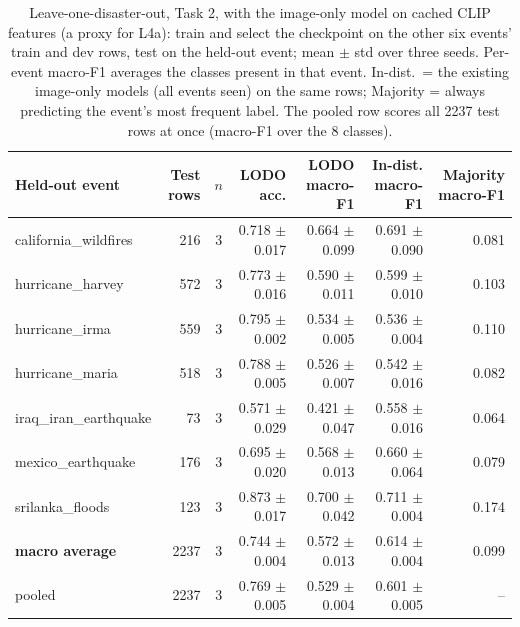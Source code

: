 \begin{table}[t]
\centering
\footnotesize
\caption{Leave-one-disaster-out, Task 2, with the image-only model on cached CLIP features (a proxy for L4a): train and select the checkpoint on the other six events' train and dev rows, test on the held-out event; mean $\pm$ std over three seeds. Per-event macro-F1 averages the classes present in that event. In-dist.\ = the existing image-only models (all events seen) on the same rows; Majority = always predicting the event's most frequent label. The pooled row scores all 2237 test rows at once (macro-F1 over the 8 classes).}
\label{tab:d_t2}
\begin{tabular}{lrcrrrr}
\toprule
Held-out event & Test rows & $n$ & LODO acc. & LODO macro-F1 & In-dist. macro-F1 & Majority macro-F1 \\
\midrule
california\_wildfires & 216 & 3 & 0.718 $\pm$ 0.017 & 0.664 $\pm$ 0.099 & 0.691 $\pm$ 0.090 & 0.081 \\
hurricane\_harvey & 572 & 3 & 0.773 $\pm$ 0.016 & 0.590 $\pm$ 0.011 & 0.599 $\pm$ 0.010 & 0.103 \\
hurricane\_irma & 559 & 3 & 0.795 $\pm$ 0.002 & 0.534 $\pm$ 0.005 & 0.536 $\pm$ 0.004 & 0.110 \\
hurricane\_maria & 518 & 3 & 0.788 $\pm$ 0.005 & 0.526 $\pm$ 0.007 & 0.542 $\pm$ 0.016 & 0.082 \\
iraq\_iran\_earthquake & 73 & 3 & 0.571 $\pm$ 0.029 & 0.421 $\pm$ 0.047 & 0.558 $\pm$ 0.016 & 0.064 \\
mexico\_earthquake & 176 & 3 & 0.695 $\pm$ 0.020 & 0.568 $\pm$ 0.013 & 0.660 $\pm$ 0.064 & 0.079 \\
srilanka\_floods & 123 & 3 & 0.873 $\pm$ 0.017 & 0.700 $\pm$ 0.042 & 0.711 $\pm$ 0.004 & 0.174 \\
\textbf{macro average} & 2237 & 3 & 0.744 $\pm$ 0.004 & 0.572 $\pm$ 0.013 & 0.614 $\pm$ 0.004 & 0.099 \\
pooled & 2237 & 3 & 0.769 $\pm$ 0.005 & 0.529 $\pm$ 0.004 & 0.601 $\pm$ 0.005 & -- \\
\bottomrule
\end{tabular}
\end{table}

